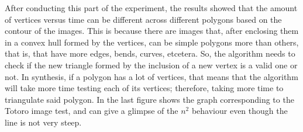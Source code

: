 \documentclass[conference]{IEEEtran}
\begin{document}
After conducting this part of the experiment, the results showed that the amount of vertices versus time can be different across different polygons based on the contour of the images. This is because there are images that, after enclosing them in a convex hull formed by the vertices, can be simple polygons more than others, that is, that have more edges, bends, curves, etcetera. So, the algorithm needs to check if the new triangle formed by the inclusion of a new vertex is a valid one or not. In synthesis, if a polygon has a lot of vertices, that means that the algorithm will take more time testing each of its vertices; therefore, taking more time to triangulate said polygon. In the last figure shows the graph corresponding to the Totoro image test, and can give a glimpse of the $n^2$ behaviour even though the line is not very steep.\\




\end{document}
